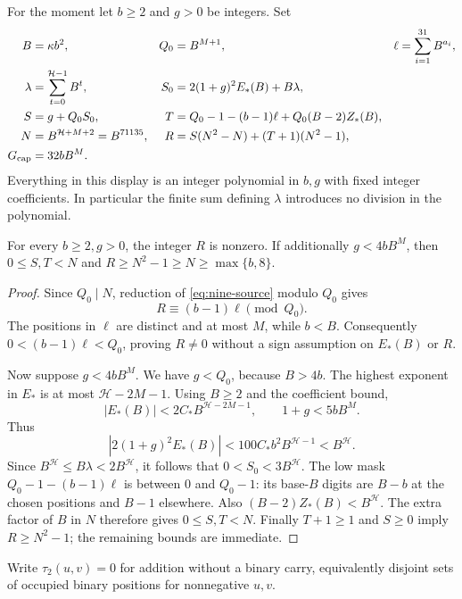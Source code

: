 For the moment let $b\ge2$ and $g>0$ be integers. Set
\begin{align}
 B&=\kappa b^2,&Q_0&=B^{M+1},&
 \ell&=\sum_{i=1}^{31}B^{a_i},\nonumber\\
 \lambda&=\sum_{t=0}^{\mathcal H-1}B^t,&
 S_0&=2(1+g)^2E_*(B)+B\lambda,\nonumber\\
 S&=g+Q_0S_0,&
 T&=Q_0-1-(b-1)\ell+Q_0(B-2)Z_*(B),\nonumber\\
 N&=B^{\mathcal H+M+2}=B^{71135},&
 R&=S(N^2-N)+(T+1)(N^2-1),\nonumber\\
 G_{\rm cap}&=32bB^M.&&
 \label{eq:nine-source}
\end{align}
Everything in this display is an integer polynomial in $b,g$ with
fixed integer coefficients. In particular the finite sum defining
$\lambda$ introduces no division in the polynomial.

\begin{lemma}
\label{lem:source-size}
For every $b\ge2,g>0$, the integer $R$ is nonzero. If additionally
$g<4bB^M$, then $0\le S,T<N$ and $R\ge N^2-1\ge N\ge\max\{b,8\}$.
\end{lemma}
\begin{proof}
Since $Q_0\mid N$, reduction of \eqref{eq:nine-source} modulo $Q_0$
gives
\[
 R\equiv (b-1)\ell\pmod{Q_0}.
\]
The positions in $\ell$ are distinct and at most $M$, while $b<B$.
Consequently $0<(b-1)\ell<Q_0$, proving $R\ne0$ without a sign
assumption on $E_*(B)$ or $R$.

Now suppose $g<4bB^M$. We have $g<Q_0$, because $B>4b$.
The highest exponent in $E_*$ is at most $\mathcal H-2M-1$.
Using $B\ge2$ and the coefficient bound,
\[
 |E_*(B)|<2C_*B^{\mathcal H-2M-1},\qquad
 1+g<5bB^M.
\]
Thus
\[
 |2(1+g)^2E_*(B)|
 <100C_*b^2B^{\mathcal H-1}<B^{\mathcal H}.
\]
Since $B^{\mathcal H}\le B\lambda<2B^{\mathcal H}$, it follows
that $0<S_0<3B^{\mathcal H}$. The low mask
$Q_0-1-(b-1)\ell$ is between $0$ and $Q_0-1$: its base-$B$ digits
are $B-b$ at the chosen positions and $B-1$ elsewhere. Also
$(B-2)Z_*(B)<B^{\mathcal H}$. The extra factor of $B$ in $N$
therefore gives $0\le S,T<N$. Finally $T+1\ge1$ and $S\ge0$ imply
$R\ge N^2-1$; the remaining bounds are immediate.
\end{proof}

Write $\tau_2(u,v)=0$ for addition without a binary carry, equivalently
disjoint sets of occupied binary positions for nonnegative $u,v$.

